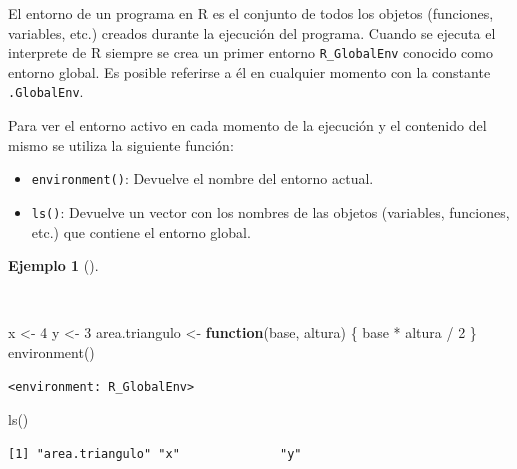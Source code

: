 \documentclass[
  a4paper,
]{scrreport}
\newenvironment{Shaded}{\begin{snugshade}}{\end{snugshade}}
\newcommand{\ControlFlowTok}[1]{\textcolor[rgb]{0.00,0.23,0.31}{\textbf{#1}}}
\newcommand{\DecValTok}[1]{\textcolor[rgb]{0.68,0.00,0.00}{#1}}
\newcommand{\FunctionTok}[1]{\textcolor[rgb]{0.28,0.35,0.67}{#1}}
\newcommand{\NormalTok}[1]{\textcolor[rgb]{0.00,0.23,0.31}{#1}}
\newcommand{\OtherTok}[1]{\textcolor[rgb]{0.00,0.23,0.31}{#1}}
\newcommand{\SpecialCharTok}[1]{\textcolor[rgb]{0.37,0.37,0.37}{#1}}
\providecommand{\tightlist}{%
  \setlength{\itemsep}{0pt}\setlength{\parskip}{0pt}}\usepackage{longtable,booktabs,array}
\theoremstyle{definition}
\theoremstyle{definition}
\newtheorem{example}{Ejemplo}[chapter]
\theoremstyle{remark}
\begin{document}
El entorno de un programa en R es el conjunto de todos los objetos
(funciones, variables, etc.) creados durante la ejecución del programa.
Cuando se ejecuta el interprete de R siempre se crea un primer entorno
\texttt{R\_GlobalEnv} conocido como entorno global. Es posible referirse
a él en cualquier momento con la constante \texttt{.GlobalEnv}.

Para ver el entorno activo en cada momento de la ejecución y el
contenido del mismo se utiliza la siguiente función:

\begin{itemize}
\tightlist
\item
  \texttt{environment()}: Devuelve el nombre del entorno actual.
\item
  \texttt{ls()}: Devuelve un vector con los nombres de las objetos
  (variables, funciones, etc.) que contiene el entorno global.
\end{itemize}

\begin{example}[]\protect\hypertarget{exm-acceso-entorno-global}{}\label{exm-acceso-entorno-global}

~

\begin{Shaded}
\begin{Highlighting}[]
\NormalTok{x }\OtherTok{\textless{}{-}} \DecValTok{4}
\NormalTok{y }\OtherTok{\textless{}{-}} \DecValTok{3}
\NormalTok{area.triangulo }\OtherTok{\textless{}{-}} \ControlFlowTok{function}\NormalTok{(base, altura) \{}
\NormalTok{  base }\SpecialCharTok{*}\NormalTok{ altura }\SpecialCharTok{/} \DecValTok{2}
\NormalTok{\}}
\FunctionTok{environment}\NormalTok{()}
\end{Highlighting}
\end{Shaded}

\begin{verbatim}
<environment: R_GlobalEnv>
\end{verbatim}

\begin{Shaded}
\begin{Highlighting}[]
\FunctionTok{ls}\NormalTok{()}
\end{Highlighting}
\end{Shaded}

\begin{verbatim}
[1] "area.triangulo" "x"              "y"             
\end{verbatim}

\end{example}
\end{document}
